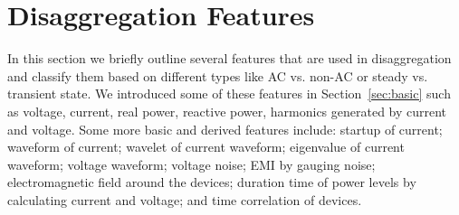 \section{Disaggregation Features}
\label{sec:features}
%

In this section we briefly outline several features that are used in disaggregation and
classify them based on different types like AC vs. non-AC or steady vs. transient state. 
%
We introduced
some of these features in Section~\ref{sec:basic} such as voltage, current, real power, 
reactive power, harmonics generated by current and voltage. Some more basic and 
derived features
include: startup of current; waveform of current;
wavelet of current waveform; eigenvalue of current waveform;
voltage waveform; voltage noise; EMI
by gauging noise; electromagnetic field around the devices; 
duration time of power levels by calculating current and voltage; 
and time correlation of devices. 


